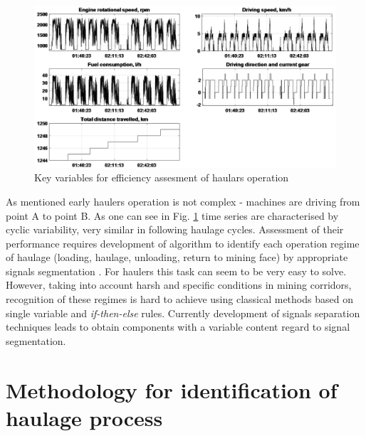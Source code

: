 \begin{figure}[ht!]
\centering
\includegraphics[width = 1\textwidth]{Wykresy/list_variables.png}
\caption{Key variables for efficiency assesment of haulars operation}
\label{fig: f1}
\end{figure}
As mentioned early haulers operation is not complex - machines are driving from point A to point B. As one can see in Fig. \ref{fig: f1} time series are characterised by cyclic variability, very similar in following haulage cycles. Assessment of their performance requires development of algorithm to identify each  operation regime of haulage (loading, haulage, unloading, return to mining face) by appropriate signals segmentation \cite{Lopatka,Polak2006,Stefaniak2015,Stefaniak2014,Wylomanska2014}. 
For haulers this task can seem to be very easy to solve. However, taking into account harsh and specific conditions in mining corridors, recognition of these regimes is hard to achieve using classical methods based on single variable and \emph{if-then-else} rules. Currently development of signals separation techniques leads to obtain components with a variable content regard to signal segmentation.
\section{Methodology for identification of haulage process}
